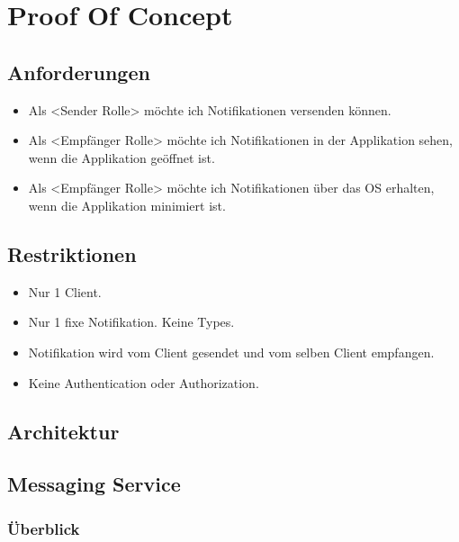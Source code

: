 \section{Proof Of Concept}



\subsection{Anforderungen}

\begin{itemize}
    \item  Als <Sender Rolle> möchte ich Notifikationen versenden können. 
    \item Als <Empfänger Rolle> möchte ich Notifikationen in der Applikation sehen, wenn die Applikation geöffnet ist.  
    \item Als <Empfänger Rolle> möchte ich Notifikationen über das OS erhalten, wenn die Applikation minimiert ist. 
\end{itemize}

\subsection{Restriktionen}

\begin{itemize}
    \item Nur 1 Client. 
    \item Nur 1 fixe Notifikation. Keine Types. 
    \item Notifikation wird vom Client gesendet und vom selben Client empfangen. 
    \item Keine Authentication oder Authorization. 
  
\end{itemize}



\subsection{Architektur}


\subsection{Messaging Service}



\subsubsection{Überblick}

